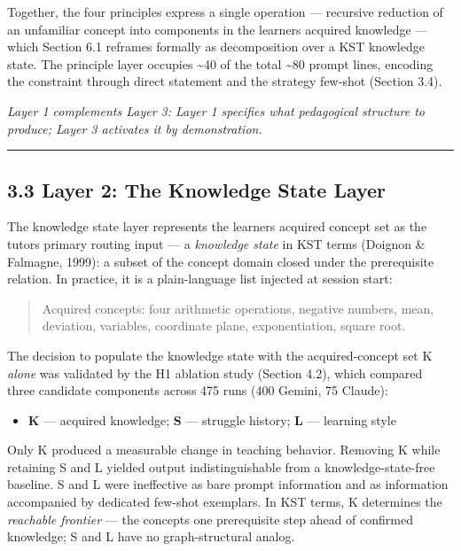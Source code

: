 \documentclass[
]{article}
\providecommand{\tightlist}{%
  \setlength{\itemsep}{0pt}\setlength{\parskip}{0pt}}
\begin{document}
Together, the four principles express a single operation --- recursive reduction of an unfamiliar concept into components in the learner\textquotesingle s acquired knowledge --- which Section 6.1 reframes formally as decomposition over a KST knowledge state. The principle layer occupies \textasciitilde40 of the total \textasciitilde80 prompt lines, encoding the constraint through direct statement and the strategy few-shot (Section 3.4).

\emph{Layer 1 complements Layer 3: Layer 1 specifies what pedagogical structure to produce; Layer 3 activates it by demonstration.}

\begin{center}\rule{0.5\linewidth}{0.5pt}\end{center}

\subsection{3.3 Layer 2: The Knowledge State Layer}\label{33-layer-2-the-knowledge-state-layer}

The knowledge state layer represents the learner\textquotesingle s acquired concept set as the tutor\textquotesingle s primary routing input --- a \emph{knowledge state} in KST terms (Doignon \& Falmagne, 1999): a subset of the concept domain closed under the prerequisite relation. In practice, it is a plain-language list injected at session start:

\begin{quote}
Acquired concepts: four arithmetic operations, negative numbers, mean, deviation, variables, coordinate plane, exponentiation, square root.
\end{quote}

The decision to populate the knowledge state with the acquired-concept set K \emph{alone} was validated by the H1 ablation study (Section 4.2), which compared three candidate components across 475 runs (400 Gemini, 75 Claude):

\begin{itemize}
\tightlist
\item
  \textbf{K} --- acquired knowledge; \textbf{S} --- struggle history; \textbf{L} --- learning style
\end{itemize}

Only K produced a measurable change in teaching behavior. Removing K while retaining S and L yielded output indistinguishable from a knowledge-state-free baseline. S and L were ineffective as bare prompt information and as information accompanied by dedicated few-shot exemplars. In KST terms, K determines the \emph{reachable frontier} --- the concepts one prerequisite step ahead of confirmed knowledge; S and L have no graph-structural analog.
\end{document}
